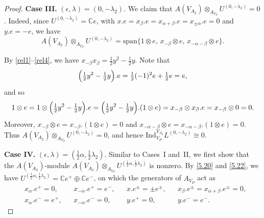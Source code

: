 \documentclass[12pt,a4paper,reqno]{amsart}
\numberwithin{equation}{section}
\numberwithin{equation}{section}
\theoremstyle{definition}
\def \C {\mathbb{C}}
\begin{document}
\begin{proof}
			
			
			\noindent	\textbf{Case III.} $(\epsilon, \lambda) = (0, -\lambda_2)$. 
			We claim that $A(V_{A_2}) \otimes_{A_{V_P}} U^{(0, -\lambda_2)} = 0$. 
			Indeed, since $U^{(0, -\lambda_2)} = \C e$, with 
			$x.e = x_{\beta}.e = x_{\alpha+\beta}.e = x_{\pm \alpha}.e = 0$ 
			and $y.e = -e$, we have 
			\[
			A(V_{A_2}) \otimes_{A_{V_P}} U^{(0, -\lambda_2)} 
			= \mathrm{span}\{1 \otimes e,\, x_{-\beta} \otimes e,\, x_{-\alpha-\beta} \otimes e\}.
			\]
			
			By \eqref{rel1}--\eqref{rel4}, we have $x_{-\beta}x_{\beta} = \frac{1}{2}y^2 - \frac{1}{2}y$. 
			Note that 
			\[
			\Bigl(\tfrac{1}{2}y^2 - \tfrac{1}{2}y\Bigr).e 
			= \tfrac{1}{2}(-1)^2 e + \tfrac{1}{2}e = e,
			\]
			and so
			\[
			1 \otimes e 
			= 1 \otimes \Bigl(\tfrac{1}{2}y^2 - \tfrac{1}{2}y\Bigr).e
			= \Bigl(\tfrac{1}{2}y^2 - \tfrac{1}{2}y\Bigr).(1 \otimes e)
			= x_{-\beta} \otimes x_{\beta}.e
			= x_{-\beta} \otimes 0
			= 0.
			\]
			Moreover, $x_{-\beta} \otimes e = x_{-\beta}.(1 \otimes e) = 0$ and 
			$x_{-\alpha-\beta} \otimes e = x_{-\alpha-\beta}.(1 \otimes e) = 0$. 
			Thus $A(V_{A_2}) \otimes_{A_{V_P}} U^{(0, -\lambda_2)} = 0$, and hence
			$
			\mathrm{Ind}^{V_{A_2}}_{V_P} L^{(0, -\lambda_2)}  \cong 0.
			$
			
			\noindent\textbf{Case IV.} $(\epsilon, \lambda) = \left(\tfrac{1}{2}\alpha, \tfrac{1}{2}\lambda_2\right)$. 
			Similar to Cases~I and~II, we first show that the 
			$A(V_{A_2})$-module $A(V_{A_2}) \otimes_{A_{V_P}} U^{(\frac{1}{2}\alpha, \frac{1}{2}\lambda_2)}$ 
			is nonzero. By \eqref{5.20} and \eqref{5.22}, we have 
			$U^{(\frac{1}{2}\alpha, \frac{1}{2}\lambda_2)} = \C e^+ \oplus \C e^-$, 
			on which the generators of $A_{V_P}$ act as
			\begin{equation}\label{eq:generatorsact}
				\begin{aligned}
					&x_{\alpha}.e^+ = 0, && x_{-\alpha}.e^+ = e^-, && x.e^{\pm} = \pm e^{\pm}, &&
					x_{\beta}.e^{\pm} = x_{\alpha+\beta}.e^{\pm} = 0,\\
					&x_{\alpha}.e^- = e^+, && x_{-\alpha}.e^- = 0, &&
					y.e^+ = 0, && y.e^- = e^-.
				\end{aligned}
			\end{equation}
			

\end{proof}
\end{document}
